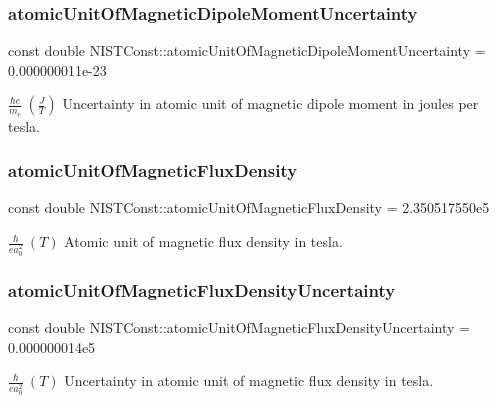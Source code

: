 \subsubsection{\texorpdfstring{atomic\+Unit\+Of\+Magnetic\+Dipole\+Moment\+Uncertainty}{atomicUnitOfMagneticDipoleMomentUncertainty}}
{\footnotesize\ttfamily const double N\+I\+S\+T\+Const\+::atomic\+Unit\+Of\+Magnetic\+Dipole\+Moment\+Uncertainty = 0.\+000000011e-\/23}

$\frac{\hbar e}{m_e} \ (\frac{J}{T})$ Uncertainty in atomic unit of magnetic dipole moment in joules per tesla. \mbox{\label{group___atomic_unit_gaaf4c9b5c25a5e1bee2f65c8a82e0ee63}} 
\subsubsection{\texorpdfstring{atomic\+Unit\+Of\+Magnetic\+Flux\+Density}{atomicUnitOfMagneticFluxDensity}}
{\footnotesize\ttfamily const double N\+I\+S\+T\+Const\+::atomic\+Unit\+Of\+Magnetic\+Flux\+Density = 2.\+350517550e5}

$\frac{\hbar}{e a_0^2} \ (T)$ Atomic unit of magnetic flux density in tesla. \mbox{\label{group___atomic_unit_ga8f5dccf4f14d5b1255acd282165808c0}} 
\subsubsection{\texorpdfstring{atomic\+Unit\+Of\+Magnetic\+Flux\+Density\+Uncertainty}{atomicUnitOfMagneticFluxDensityUncertainty}}
{\footnotesize\ttfamily const double N\+I\+S\+T\+Const\+::atomic\+Unit\+Of\+Magnetic\+Flux\+Density\+Uncertainty = 0.\+000000014e5}

$\frac{\hbar}{e a_0^2} \ (T)$ Uncertainty in atomic unit of magnetic flux density in tesla. \mbox{\label{group___atomic_unit_ga9c2b29b9a46e8dfd78837ef0c8a16bec}} 
